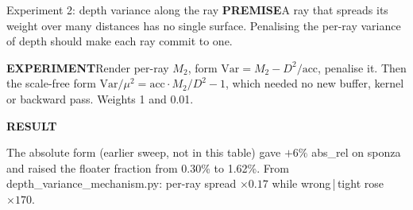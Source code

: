 \documentclass[aspectratio=169,9pt]{beamer}
\makeatletter
\newcommand{\dn}[1]{\textcolor{bad}{#1}}
\newcommand{\code}[1]{{\ttfamily\fontsize{0.92\f@size}{\f@baselineskip}\selectfont #1}}
\newcommand{\lbl}[1]{\textcolor{lblcol}{\scriptsize\bfseries #1}\hspace{0.5em}}
\newcommand{\pre}{\lbl{PREMISE}}
\newcommand{\expt}{\lbl{EXPERIMENT}}
\newcommand{\res}{\lbl{RESULT}}
\makeatother
\begin{document}
\begin{frame}{Experiment 2: depth variance along the ray}
  \pre A ray that spreads its weight over many distances has no single surface. Penalising the
  per-ray variance of depth should make each ray commit to one.

  \expt Render per-ray $M_2$, form $\mathrm{Var} = M_2 - D^2/\mathrm{acc}$, penalise it.
  Then the scale-free form $\mathrm{Var}/\mu^2 = \mathrm{acc}\cdot M_2/D^2 - 1$, which needed no
  new buffer, kernel or backward pass. Weights 1 and 0.01.

  \res
  \begin{center}\scriptsize
    
  \end{center}
  \vspace{0.3em}
  {\footnotesize The absolute form (earlier sweep, not in this table) gave \dn{$+6\%$}
  \code{abs\_rel} on \code{sponza} and raised the floater fraction from 0.30\% to 1.62\%. From
  \code{depth\_variance\_mechanism.py}: per-ray spread $\times0.17$ while
  \code{wrong\,|\,tight} rose \dn{$\times170$}.}
\end{frame}
\end{document}
